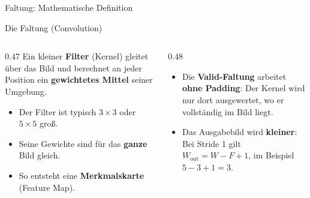{\begin{frame}{Faltung: Mathematische Definition}
\end{frame}

\begin{frame}{Die Faltung (Convolution)}
\begin{columns}
\begin{column}{0.47\textwidth}
Ein kleiner \textbf{Filter} (Kernel) gleitet über das Bild und berechnet an jeder Position ein \textbf{gewichtetes Mittel} seiner Umgebung.
\begin{itemize}
\item Der Filter ist typisch $3 \times 3$ oder $5 \times 5$ groß.
\item Seine Gewichte sind für das \textbf{ganze} Bild gleich.
\item So entsteht eine \textbf{Merkmalskarte} (Feature Map).
\end{itemize}
\end{column}
\begin{column}{0.48\textwidth}
\centering
{}

\footnotesize

\begin{itemize}
    \item Die \textbf{Valid-Faltung} arbeitet \textbf{ohne Padding}: Der Kernel wird nur dort ausgewertet, wo er vollständig im Bild liegt.
    \item Das Ausgabebild wird \textbf{kleiner}: Bei Stride 1 gilt $W_{\text{out}} = W - F + 1$, im Beispiel $5 - 3 + 1 = 3$.
\end{itemize}

\end{column}
\end{columns}
\end{frame}



}
